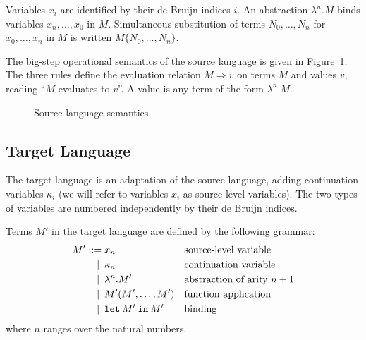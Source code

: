 \documentclass[a4paper,11pt,draft]{article}
\newcommand{\kw}[1]{\mathtt{#1}}
\begin{document}
Variables $x_{i}$ are identified by their de Bruijn indices $i$.
An abstraction $\lambda^{n}.M$ binds variables $x_{n}, \ldots, x_{0}$ in $M$.
Simultaneous substitution of terms $N_{0}, \ldots, N_{n}$ for
$x_{0}, \ldots, x_{n}$ in $M$ is written $M\{N_{0}, \ldots, N_{n}\}$.

The big-step operational semantics of the source language is given in
Figure~\ref{fig:sourcesemantics}. The three rules define the evaluation relation
$M \Rightarrow v$ on terms $M$ and values $v$, reading ``$M$ evaluates to $v$''.
A value is any term of the form $\lambda^{n}.M$.

\begin{figure}
\caption{Source language semantics}
\label{fig:sourcesemantics}
\end{figure}

\subsection{Target Language}

The target language is an adaptation of the source language, adding
continuation variables $\kappa_{i}$ (we will refer to variables $x_{i}$
as source-level variables). The two types of variables are numbered
independently by their de Bruijn indices.

Terms $M'$ in the target language are defined by the following grammar:
\begin{align*}
M' ::=            &\; x_{n}
                  && \text{source-level variable} \\
\llap{\textbar\:} &\; \kappa_{n}
                  && \text{continuation variable} \\
\llap{\textbar\:} &\; \lambda^{n}.M'
                  && \text{abstraction of arity $n+1$} \\
\llap{\textbar\:} &\; M'(M', \ldots, M')
                  && \text{function application} \\
\llap{\textbar\:} &\; \kw{let} \: M' \: \kw{in} \: M'
                  && \text{binding}
\end{align*}
where $n$ ranges over the natural numbers.
\end{document}

